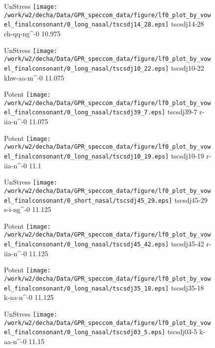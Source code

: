 \documentclass{article}
\begin{document}
\begin{figure}[t]
\begin{minipage}[b]{.24\textwidth}
UnStress
\centering
\texttt{[image: /work/w2/decha/Data/GPR\_speccom\_data/figure/lf0\_plot\_by\_vowel\_finalconsonant/0\_long\_nasal/tscsdj14\_28.eps]}
tscsdj14-28 ch-qq-ng\textasciicircum-0 10.975
\end{minipage}
\begin{minipage}[b]{.24\textwidth}
UnStress
\centering
\texttt{[image: /work/w2/decha/Data/GPR\_speccom\_data/figure/lf0\_plot\_by\_vowel\_finalconsonant/0\_long\_nasal/tscsdj10\_22.eps]}
tscsdj10-22 khw-aa-m\textasciicircum-0 11.075
\end{minipage}
\begin{minipage}[b]{.24\textwidth}
\colorbox{Apricot}{Potent}
\centering
\texttt{[image: /work/w2/decha/Data/GPR\_speccom\_data/figure/lf0\_plot\_by\_vowel\_finalconsonant/0\_long\_nasal/tscsdj39\_7.eps]}
tscsdj39-7 r-iia-n\textasciicircum-0 11.075
\end{minipage}
\begin{minipage}[b]{.24\textwidth}
\colorbox{Apricot}{Potent}
\centering
\texttt{[image: /work/w2/decha/Data/GPR\_speccom\_data/figure/lf0\_plot\_by\_vowel\_finalconsonant/0\_long\_nasal/tscsdj10\_19.eps]}
tscsdj10-19 r-iia-n\textasciicircum-0 11.1
\end{minipage}
\end{figure}
\clearpage
\begin{figure}[t]
\begin{minipage}[b]{.24\textwidth}
UnStress
\centering
\texttt{[image: /work/w2/decha/Data/GPR\_speccom\_data/figure/lf0\_plot\_by\_vowel\_finalconsonant/0\_short\_nasal/tscsdj45\_29.eps]}
tscsdj45-29 s-i-ng\textasciicircum-0 11.125
\end{minipage}
\begin{minipage}[b]{.24\textwidth}
\colorbox{Apricot}{Potent}
\centering
\texttt{[image: /work/w2/decha/Data/GPR\_speccom\_data/figure/lf0\_plot\_by\_vowel\_finalconsonant/0\_long\_nasal/tscsdj45\_42.eps]}
tscsdj45-42 r-iia-n\textasciicircum-0 11.125
\end{minipage}
\begin{minipage}[b]{.24\textwidth}
\colorbox{Apricot}{Potent}
\centering
\texttt{[image: /work/w2/decha/Data/GPR\_speccom\_data/figure/lf0\_plot\_by\_vowel\_finalconsonant/0\_long\_nasal/tscsdj35\_18.eps]}
tscsdj35-18 k-aa-n\textasciicircum-0 11.125
\end{minipage}
\begin{minipage}[b]{.24\textwidth}
UnStress
\centering
\texttt{[image: /work/w2/decha/Data/GPR\_speccom\_data/figure/lf0\_plot\_by\_vowel\_finalconsonant/0\_long\_nasal/tscsdj03\_5.eps]}
tscsdj03-5 k-aa-n\textasciicircum-0 11.15
\end{minipage}
\end{figure}
\end{document}
